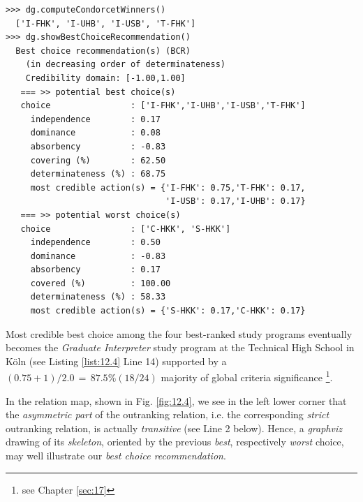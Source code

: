 \begin{lstlisting}[caption={Alice's best choice recommendation},label=list:12.4]
>>> dg.computeCondorcetWinners()
  ['I-FHK', 'I-UHB', 'I-USB', 'T-FHK'] 
>>> dg.showBestChoiceRecommendation()
  Best choice recommendation(s) (BCR)
    (in decreasing order of determinateness)   
    Credibility domain: [-1.00,1.00]
   === >> potential best choice(s)
   choice                : ['I-FHK','I-UHB','I-USB','T-FHK']
     independence        : 0.17
     dominance           : 0.08
     absorbency          : -0.83
     covering (%)        : 62.50
     determinateness (%) : 68.75
     most credible action(s) = {'I-FHK': 0.75,'T-FHK': 0.17,
                                'I-USB': 0.17,'I-UHB': 0.17}
   === >> potential worst choice(s) 
   choice                : ['C-HKK', 'S-HKK']
     independence        : 0.50
     dominance           : -0.83
     absorbency          : 0.17
     covered (%)         : 100.00
     determinateness (%) : 58.33
     most credible action(s) = {'S-HKK': 0.17,'C-HKK': 0.17}
\end{lstlisting}
   
Most credible best choice among the four best-ranked study programs eventually becomes the \emph{Graduate Interpreter} study program at the Technical High School in Köln (see Listing \ref{list:12.4} Line 14) supported by a $(0.75 + 1)/2.0 \,=\,87.5\% (18/24)$ majority of global criteria significance \footnote{see Chapter \ref{sec:17}}.

In the relation map, shown in Fig. \ref{fig:12.4}, we see in the left lower corner that the \emph{asymmetric part} of the outranking relation, i.e. the corresponding \emph{strict} outranking relation, is actually \emph{transitive} (see Line 2 below). Hence, a \emph{graphviz} drawing of its \emph{skeleton}, oriented by the previous \emph{best}, respectively \emph{worst} choice, may well illustrate our \emph{best choice recommendation}.

